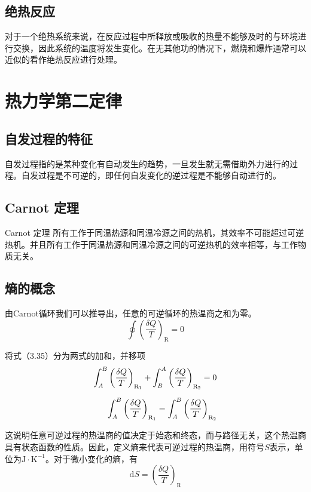 \documentclass[lang=cn,newtx,11pt,scheme=chinese]{elegantbook}
\begin{document}
\subsection{绝热反应}
对于一个绝热系统来说，在反应过程中所释放或吸收的热量不能够及时的与环境进行交换，因此系统的温度将发生变化。在无其他功的情况下，燃烧和爆炸通常可以近似的看作绝热反应进行处理。

\section{热力学第二定律}
\subsection{自发过程的特征}
自发过程指的是某种变化有自动发生的趋势，一旦发生就无需借助外力进行的过程。自发过程是不可逆的，即任何自发变化的逆过程是不能够自动进行的。

\subsection{Carnot 定理}
\begin{theorem}{Carnot 定理}
	所有工作于同温热源和同温冷源之间的热机，其效率不可能超过可逆热机。并且所有工作于同温热源和同温冷源之间的可逆热机的效率相等，与工作物质无关。
\end{theorem}

\subsection{熵的概念}
由Carnot循环我们可以推导出，任意的可逆循环的热温商之和为零。
\begin{equation}
	\oint \left ( \frac{\delta Q}{T}  \right ) _\mathrm{R} =0
\end{equation}

将式（3.35）分为两式的加和，并移项
\begin{equation}
	\begin{aligned}
		\int_{A}^{B} \left ( \frac{\delta Q}{T}  \right )_{\mathrm{R_1} }+\int_{B}^{A} \left ( \frac{\delta Q}{T}  \right )_{\mathrm{R_2} } =0 \\[1.5ex]
		\int_{A}^{B} \left ( \frac{\delta Q}{T}  \right )_{\mathrm{R_1} } =\int_{A}^{B} \left ( \frac{\delta Q}{T}  \right )_{\mathrm{R_2} }
	\end{aligned} \notag
\end{equation}

这说明任意可逆过程的热温商的值决定于始态和终态，而与路径无关，这个热温商具有状态函数的性质。因此，定义熵来代表可逆过程的热温商，用符号$S$表示，单位为$\mathrm{J \cdot K^{-1}}$。对于微小变化的熵，有
\begin{equation}
	\mathrm{d}S=\left ( \frac{\delta Q}{T}  \right )_{\mathrm{R} }  
\end{equation}
\end{document}
